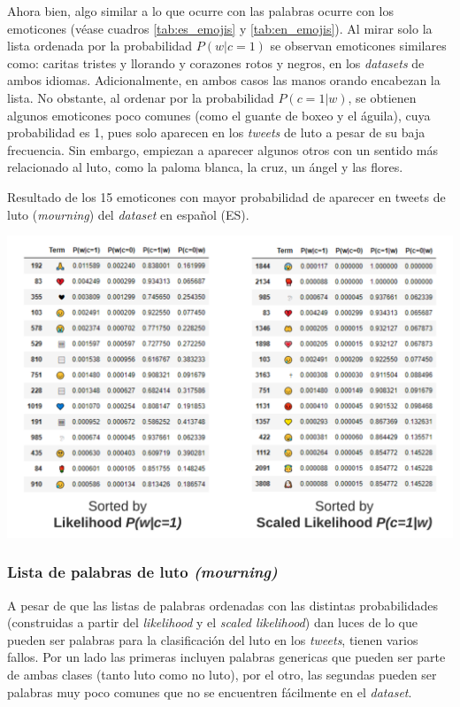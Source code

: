 Ahora bien, algo similar a lo que ocurre con las palabras ocurre con los emoticones (véase cuadros \ref{tab:es_emojis} y \ref{tab:en_emojis}). Al mirar solo la lista ordenada por la probabilidad $P(w|c=1)$ se observan emoticones similares como: caritas tristes y llorando y corazones rotos y negros, en los \textit{datasets} de ambos idiomas. Adicionalmente, en ambos casos las manos orando encabezan la lista. No obstante, al ordenar por la probabilidad $P(c=1|w)$, se obtienen algunos emoticones poco comunes (como el guante de boxeo y el águila), cuya probabilidad es 1, pues solo aparecen en los \textit{tweets} de luto a pesar de su baja frecuencia. Sin embargo, empiezan a aparecer algunos otros con un sentido más relacionado al luto, como la paloma blanca, la cruz, un ángel y las flores. 

\begin{table}[H]
    \centering
    \caption{Resultado de los 15 emoticones con mayor probabilidad de aparecer en tweets de luto (\textit{mourning}) del \textit{dataset} en español (ES).}
    \label{tab:en_emojis}
    \includegraphics[width=\textwidth]{doc/images/EN_Emojis.png}
\end{table}

\subsubsection{Lista de palabras de luto \textit{(mourning)}}

A pesar de que las listas de palabras ordenadas con las distintas probabilidades (construidas a partir del \textit{likelihood} y el \textit{scaled likelihood}) dan luces de lo que pueden ser palabras para la clasificación del luto en los \textit{tweets}, tienen varios fallos. Por un lado las primeras incluyen palabras genericas que pueden ser parte de ambas clases (tanto luto como no luto), por el otro, las segundas pueden ser palabras muy poco comunes que no se encuentren fácilmente en el \textit{dataset}.

